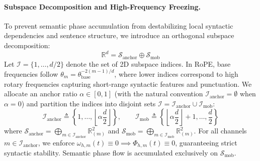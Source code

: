 \documentclass[11pt,a4paper]{article}
\theoremstyle{definition}
\begin{document}
\paragraph{Subspace Decomposition and High-Frequency Freezing.}
To prevent semantic phase accumulation from destabilizing local syntactic dependencies and sentence structure, we introduce an orthogonal subspace decomposition:
\begin{equation}
\mathbb{R}^d = \mathcal{S}_{\text{anchor}} \oplus \mathcal{S}_{\text{mob}}
\end{equation}
Let $\mathcal{I} = \{1, \dots, d/2\}$ denote the set of 2D subspace indices. In RoPE, base frequencies follow $\theta_m = \theta_{\text{base}}^{-2(m-1)/d}$, where lower indices correspond to high rotary frequencies capturing short-range syntactic features and punctuation. We allocate an anchor ratio $\alpha \in [0, 1]$ (with the natural convention $\mathcal{I}_{\text{anchor}} = \emptyset$ when $\alpha = 0$) and partition the indices into disjoint sets $\mathcal{I} = \mathcal{I}_{\text{anchor}} \cup \mathcal{I}_{\text{mob}}$:
\begin{equation}
\mathcal{I}_{\text{anchor}} \triangleq \left\{1, \dots, \left\lfloor \alpha \frac{d}{2} \right\rfloor \right\}, \qquad \mathcal{I}_{\text{mob}} \triangleq \left\{\left\lfloor \alpha \frac{d}{2} \right\rfloor + 1, \dots, \frac{d}{2} \right\}
\end{equation}
where $\mathcal{S}_{\text{anchor}} = \bigoplus_{m \in \mathcal{I}_{\text{anchor}}} \mathbb{R}^2_{(m)}$ and $\mathcal{S}_{\text{mob}} = \bigoplus_{m \in \mathcal{I}_{\text{mob}}} \mathbb{R}^2_{(m)}$.
For all channels $m \in \mathcal{I}_{\text{anchor}}$, we enforce $\omega_{h,m}(t) \equiv 0 \implies \Phi_{h,m}(t) \equiv 0$, guaranteeing strict syntactic stability. Semantic phase flow is accumulated exclusively on $\mathcal{S}_{\text{mob}}$.
\end{document}
